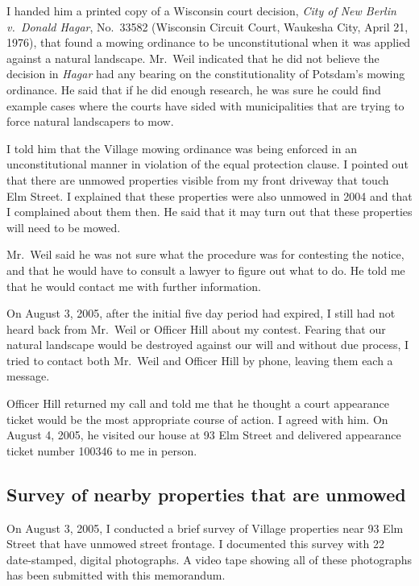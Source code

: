 \documentclass[12pt]{article}
\begin{document}
I handed him a printed copy of a Wisconsin court decision, {\em City of New Berlin v.\ Donald Hagar}, No.\ 33582 (Wisconsin Circuit Court, Waukesha City, April 21, 1976), that found a mowing ordinance to be unconstitutional when it was applied against a natural landscape.
Mr.\ Weil indicated that he did not believe the decision in {\em Hagar} had any bearing on the constitutionality of Potsdam's mowing ordinance.
He said that if he did enough research, he was sure he could find example cases where the courts have sided with municipalities that are trying to force natural landscapers to mow.

I told him that the Village mowing ordinance was being enforced in an unconstitutional manner in violation of the equal protection clause.
I pointed out that there are unmowed properties visible from my front driveway that touch Elm Street.
I explained that these properties were also unmowed in 2004 and that I complained about them then.
He said that it may turn out that these properties will need to be mowed.

Mr.\ Weil said he was not sure what the procedure was for contesting the notice, and that he would have to consult a lawyer to figure out what to do.
He told me that he would contact me with further information. 

On August 3, 2005, after the initial five day period had expired, I still had not heard back from Mr.\ Weil or Officer Hill about my contest.
Fearing that our natural landscape would be destroyed against our will and without due process, I tried to contact both Mr.\ Weil and Officer Hill by phone, leaving them each a message.

Officer Hill returned my call and told me that he thought a court appearance ticket would be the most appropriate course of action.
I agreed with him.
On August 4, 2005, he visited our house at 93 Elm Street and delivered appearance ticket number 100346 to me in person.

\subsection{Survey of nearby properties that are unmowed}
On August 3, 2005, I conducted a brief survey of Village properties near 93 Elm Street that have unmowed street frontage.
I documented this survey with 22 date-stamped, digital photographs.
A video tape showing all of these photographs has been submitted with this memorandum.
\end{document}
